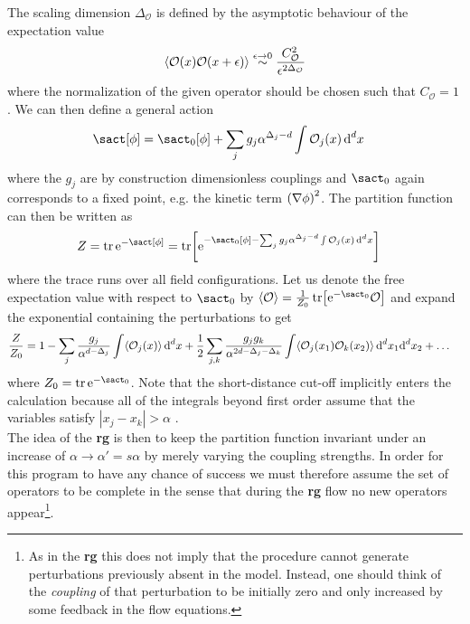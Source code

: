 \documentclass[english, parskip=full]{scrartcl}
\renewcommand{\gls}[1]{\textbf{#1}}
\begin{document}
The scaling dimension $\Delta_\mathcal{O}$ is defined by the asymptotic behaviour of the expectation value
\begin{align*}
\bra*{\mathcal{O}(x) \mathcal{O}(x+\epsilon)} \overset{\epsilon\rightarrow 0}{ \sim } \frac{C_\mathcal{O}^2}{\epsilon^{2\Delta_\mathcal{O}}}
\end{align*}
where the normalization of the given operator should be chosen such that $C_\mathcal{O} = 1$ \cite[]{QFT_RG_Fradkin_2021}.
We can then define a general action
\begin{align*}
\sact[\phi] &= \sact_0[\phi] + \sum_j g_j \alpha^{\Delta_j - d} \int \mathcal{O}_j(x)\,\d^dx
\end{align*}
where the $g_j$ are by construction dimensionless couplings and $\sact_0$ again corresponds to a fixed point, e.g. the kinetic term $\kla*{\nabla\phi}^2$.
The partition function can then be written as
\begin{align*}
Z &= \tr \powe{-\sact[\phi]} = \tr \klb*{\powe{-\sact_0[\phi] - \sum_j g_j \alpha^{\Delta_j - d} \int \mathcal{O}_j(x) \,\d^dx}}
\end{align*}
where the trace runs over all field configurations.
Let us denote the free expectation value with respect to $\sact_0$ by $\bra*{\mathcal{O}} = \frac{1}{Z_0} \tr \klb*{\powe{-\sact_0} \mathcal{O}}$ and expand the exponential containing the perturbations to get
\begin{align*}
\frac{Z}{Z_0} &= 1 - \sum_j \frac{g_j}{\alpha^{d-\Delta_j}} \int \bra*{\mathcal{O}_j(x)}\,\d^dx + \frac{1}{2} \sum_{j,k} \frac{g_jg_k}{\alpha^{2d - \Delta_j - \Delta_k}} \int \bra*{\mathcal{O}_j(x_1) \mathcal{O}_k(x_2)}\,\d^dx_1\d^dx_2 + \dots
\end{align*}
where $Z_0=\tr \powe{-\sact_0}$.
Note that the short-distance cut-off implicitly enters the calculation because all of the integrals beyond first order assume that the variables satisfy $|x_j - x_k| > \alpha$ \cite[]{Fradkin_2013}.\\
The idea of the \gls{rg} is then to keep the partition function invariant under an increase of $\alpha\rightarrow \alpha'=s\alpha$ by merely varying the coupling strengths.
In order for this program to have any chance of success we must therefore assume the set of operators to be complete in the sense that during the \gls{rg} flow no new operators appear\footnote{As in the \tms{} \gls{rg} this does not imply that the procedure cannot generate perturbations previously absent in the model. Instead, one should think of the \emph{coupling} of that perturbation to be initially zero and only increased by some feedback in the flow equations.}.\\
\end{document}
